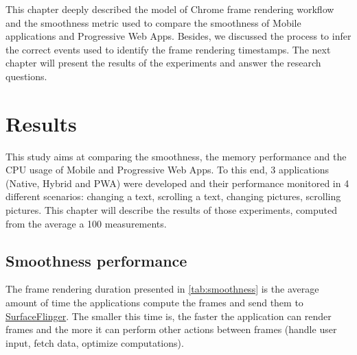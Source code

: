 \documentclass{kththesis}
\begin{document}
This chapter deeply described the model of Chrome frame rendering workflow and the smoothness metric used to compare the smoothness of Mobile applications and Progressive Web Apps. Besides, we discussed the process to infer the correct events used to identify the frame rendering timestamps. The next chapter will present the results of the experiments and answer the research questions.

\chapter{Results}
\label{ch:results}

This study aims at comparing the smoothness, the memory performance and the CPU usage of Mobile and Progressive Web Apps. To this end, 3 applications (Native, Hybrid and PWA) were developed and their performance monitored in 4 different scenarios: changing a text, scrolling a text, changing pictures, scrolling pictures. This chapter will describe the results of those experiments, computed from the average a 100 measurements. 

\label{results:performance}

\section{Smoothness performance}

The frame rendering duration presented in \autoref{tab:smoothness} is the average amount of time the applications compute the frames and send them to \hyperref[def:surfaceflinger]{SurfaceFlinger}. The smaller this time is, the faster the application can render frames and the more it can perform other actions between frames (handle user input, fetch data, optimize computations). 
\end{document}
